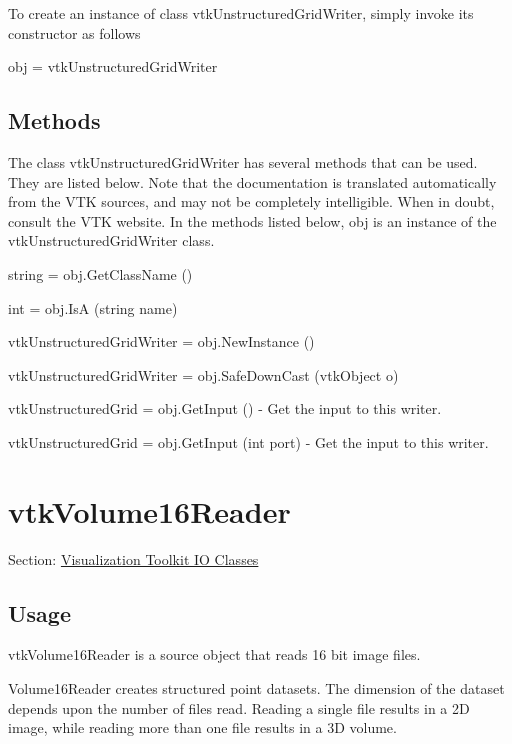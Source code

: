 To create an instance of class vtk\-Unstructured\-Grid\-Writer, simply invoke its constructor as follows \begin{DoxyVerb}  obj = vtkUnstructuredGridWriter
\end{DoxyVerb}
 \hypertarget{vtkwidgets_vtkxyplotwidget_Methods}{}\subsection{Methods}\label{vtkwidgets_vtkxyplotwidget_Methods}
The class vtk\-Unstructured\-Grid\-Writer has several methods that can be used. They are listed below. Note that the documentation is translated automatically from the V\-T\-K sources, and may not be completely intelligible. When in doubt, consult the V\-T\-K website. In the methods listed below, {\ttfamily obj} is an instance of the vtk\-Unstructured\-Grid\-Writer class. 
\begin{DoxyItemize}
\item {\ttfamily string = obj.\-Get\-Class\-Name ()}  
\item {\ttfamily int = obj.\-Is\-A (string name)}  
\item {\ttfamily vtk\-Unstructured\-Grid\-Writer = obj.\-New\-Instance ()}  
\item {\ttfamily vtk\-Unstructured\-Grid\-Writer = obj.\-Safe\-Down\-Cast (vtk\-Object o)}  
\item {\ttfamily vtk\-Unstructured\-Grid = obj.\-Get\-Input ()} -\/ Get the input to this writer.  
\item {\ttfamily vtk\-Unstructured\-Grid = obj.\-Get\-Input (int port)} -\/ Get the input to this writer.  
\end{DoxyItemize}\hypertarget{vtkio_vtkvolume16reader}{}\section{vtk\-Volume16\-Reader}\label{vtkio_vtkvolume16reader}
Section\-: \hyperlink{sec_vtkio}{Visualization Toolkit I\-O Classes} \hypertarget{vtkwidgets_vtkxyplotwidget_Usage}{}\subsection{Usage}\label{vtkwidgets_vtkxyplotwidget_Usage}
vtk\-Volume16\-Reader is a source object that reads 16 bit image files.

Volume16\-Reader creates structured point datasets. The dimension of the dataset depends upon the number of files read. Reading a single file results in a 2\-D image, while reading more than one file results in a 3\-D volume.

